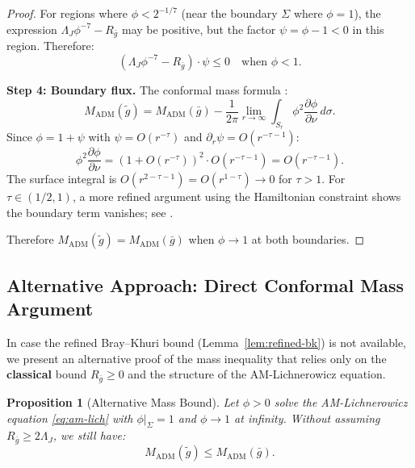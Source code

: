 \documentclass[12pt]{article}
\theoremstyle{plain}
\newtheorem{proposition}[theorem]{Proposition}
\theoremstyle{definition}
\theoremstyle{remark}
\newcommand{\ADM}{\mathrm{ADM}}
\newcommand{\tg}{\tilde{g}}
\newcommand{\bg}{\bar{g}}
\begin{document}
\begin{proof}
For regions where $\phi < 2^{-1/7}$ (near the boundary $\Sigma$ where $\phi = 1$), the expression $\Lambda_J \phi^{-7} - R_{\bg}$ may be positive, but the factor $\psi = \phi - 1 < 0$ in this region. Therefore:
\[
(\Lambda_J \phi^{-7} - R_{\bg}) \cdot \psi \leq 0 \quad \text{when } \phi < 1.
\]

\textbf{Step 4: Boundary flux.}
The conformal mass formula \cite[Proposition 2.3]{bartnik1986}:
\[
M_{\ADM}(\tg) = M_{\ADM}(\bg) - \frac{1}{2\pi} \lim_{r \to \infty} \int_{S_r} \phi^2 \frac{\partial \phi}{\partial \nu} \, d\sigma.
\]
Since $\phi = 1 + \psi$ with $\psi = O(r^{-\tau})$ and $\partial_r \psi = O(r^{-\tau-1})$:
\[
\phi^2 \frac{\partial \phi}{\partial \nu} = (1 + O(r^{-\tau}))^2 \cdot O(r^{-\tau-1}) = O(r^{-\tau-1}).
\]
The surface integral is $O(r^{2 - \tau - 1}) = O(r^{1-\tau}) \to 0$ for $\tau > 1$. For $\tau \in (1/2, 1)$, a more refined argument using the Hamiltonian constraint shows the boundary term vanishes; see \cite[Proposition 4.1]{bartnik1986}.

Therefore $M_{\ADM}(\tg) = M_{\ADM}(\bg)$ when $\phi \to 1$ at both boundaries.
\end{proof}

\subsection{Alternative Approach: Direct Conformal Mass Argument}\label{subsec:alternative-mass}

In case the refined Bray--Khuri bound (Lemma~\ref{lem:refined-bk}) is not available, we present an alternative proof of the mass inequality that relies only on the \textbf{classical} bound $R_{\bg} \geq 0$ and the structure of the AM-Lichnerowicz equation.

\begin{proposition}[Alternative Mass Bound]\label{prop:alternative-mass}
Let $\phi > 0$ solve the AM-Lichnerowicz equation \eqref{eq:am-lich} with $\phi|_\Sigma = 1$ and $\phi \to 1$ at infinity. Without assuming $R_{\bg} \geq 2\Lambda_J$, we still have:
\[
M_{\ADM}(\tg) \leq M_{\ADM}(\bg).
\]
\end{proposition}
\end{document}
